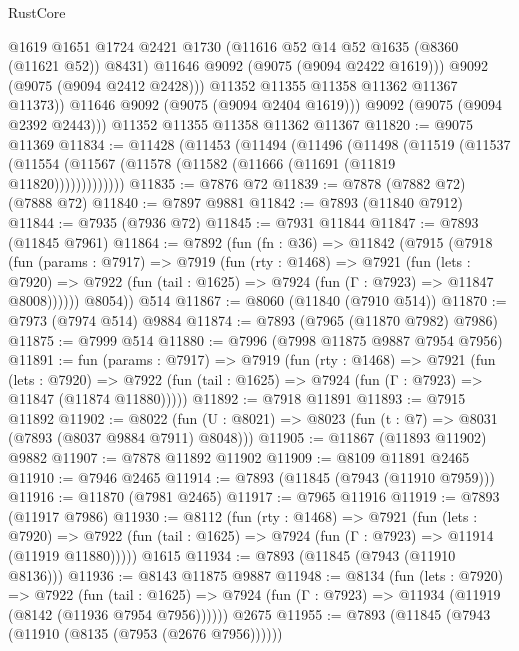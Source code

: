 \begin{lexlean}{RustCore}
\begin{coremodule}
                @1619
                @1651
                @1724
                @2421
                @1730
                (@11616 @52 @14 @52 @1635 (@8360 (@11621 @52)) @8431)
                @11646
                @9092
                (@9075 (@9094 @2422 @1619)))
              @9092
              (@9075 (@9094 @2412 @2428)))
            @11352
            @11355
            @11358
            @11362
            @11367
            @11373))
        @11646
        @9092
        (@9075 (@9094 @2404 @1619)))
      @9092
      (@9075 (@9094 @2392 @2443)))
    @11352
    @11355
    @11358
    @11362
    @11367
@11820 := @9075 @11369
@11834 := @11428
    (@11453
      (@11494
        (@11496
          (@11498
            (@11519
              (@11537 (@11554 (@11567 (@11578 (@11582 (@11666 (@11691 (@11819 @11820)))))))))))))
@11835 := @7876 @72
@11839 := @7878 (@7882 @72) (@7888 @72)
@11840 := @7897 @9881
@11842 := @7893 (@11840 @7912)
@11844 := @7935 (@7936 @72)
@11845 := @7931 @11844
@11847 := @7893 (@11845 @7961)
@11864 := @7892
    (fun (fn : @36) =>
    @11842
      (@7915
        (@7918
          (fun (params : @7917) =>
          @7919
            (fun (rty : @1468) =>
            @7921
              (fun (lets : @7920) =>
              @7922 (fun (tail : @1625) => @7924 (fun (Γ : @7923) => @11847 @8008))))))
        @8054))
    @514
@11867 := @8060 (@11840 (@7910 @514))
@11870 := @7973 (@7974 @514) @9884
@11874 := @7893 (@7965 (@11870 @7982) @7986)
@11875 := @7999 @514
@11880 := @7996 (@7998 @11875 @9887 @7954 @7956)
@11891 := fun (params : @7917) =>
  @7919
    (fun (rty : @1468) =>
    @7921
      (fun (lets : @7920) =>
      @7922 (fun (tail : @1625) => @7924 (fun (Γ : @7923) => @11847 (@11874 @11880)))))
@11892 := @7918 @11891
@11893 := @7915 @11892
@11902 := @8022 (fun (U : @8021) => @8023 (fun (t : @7) => @8031 (@7893 (@8037 @9884 @7911) @8048)))
@11905 := @11867 (@11893 @11902) @9882
@11907 := @7878 @11892 @11902
@11909 := @8109 @11891 @2465
@11910 := @7946 @2465
@11914 := @7893 (@11845 (@7943 (@11910 @7959)))
@11916 := @11870 (@7981 @2465)
@11917 := @7965 @11916
@11919 := @7893 (@11917 @7986)
@11930 := @8112
    (fun (rty : @1468) =>
    @7921
      (fun (lets : @7920) =>
      @7922 (fun (tail : @1625) => @7924 (fun (Γ : @7923) => @11914 (@11919 @11880)))))
    @1615
@11934 := @7893 (@11845 (@7943 (@11910 @8136)))
@11936 := @8143 @11875 @9887
@11948 := @8134
    (fun (lets : @7920) =>
    @7922
      (fun (tail : @1625) =>
      @7924 (fun (Γ : @7923) => @11934 (@11919 (@8142 (@11936 @7954 @7956))))))
    @2675
@11955 := @7893 (@11845 (@7943 (@11910 (@8135 (@7953 (@2676 @7956))))))

\end{coremodule}
\end{lexlean}
